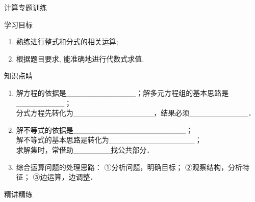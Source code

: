 \documentclass[10pt,twoside,fleqn]{ctexart}
\renewcommand*{\ge}{\geqslant}
\begin{document}
\begin{center}
{\kaishu{}计算专题训练}
\end{center}


{\heiti 学习目标}
\begin{enumerate}
\item
熟练进行整式和分式的相关运算;

\item
根据题目要求, 能准确地进行代数式求值.
\end{enumerate}

{\heiti 知识点睛}

\begin{enumerate}




\item 解方程的依据是{\_}{\_}{\_}{\_}{\_}{\_}{\_}{\_}{\_}{\_}{\_}{\_}{\_}；解多元方程组的基本思路是{\_}{\_}{\_}{\_}{\_}{\_}{\_}{\_}{\_}；\\
分式方程先转化为{\_}{\_}{\_}{\_}{\_}{\_}{\_}{\_}{\_}{\_}{\_}{\_}{\_}{\_}{\_}，结果必须{\_}{\_}{\_}{\_}{\_}{\_}{\_}{\_}{\_}{\_}{\_}．
\item 解不等式的依据是{\_}{\_}{\_}{\_}{\_}{\_}{\_}{\_}{\_}{\_}{\_}{\_}{\_}{\_}{\_}{\_}{\_}{\_}{\_}{\_}{\_}；\\
解不等式的基本思路是转化为{\_}{\_}{\_}{\_}{\_}{\_}{\_}{\_}{\_}{\_}{\_}{\_}{\_}{\_}{\_}{\_}；\\
求解集时，常借助{\_}{\_}{\_}{\_}{\_}{\_}{\_}找公共部分．
\item 综合运算问题的处理思路：
①分析问题，明确目标；
②观察结构，分析特征；
③边运算，边调整．



\end{enumerate}

{\heiti 精讲精练}
\end{document}
